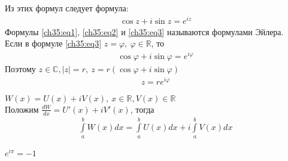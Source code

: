 Из этих формул следует формула:
\begin{gather}
  \cos z + i \sin z = e^{iz} \label{ch35:eq3}
\end{gather}
Формулы \eqref{ch35:eq1}, \eqref{ch35:eq2} и \eqref{ch35:eq3} называются
формулами Эйлера. \\
Если в формуле \eqref{ch35:eq3} $z = \varphi, \ \varphi \in
\mathbb{R}$, то
\begin{gather*}
  \cos \varphi + i \sin \varphi = e^{i\varphi}
\end{gather*}
Поэтому $z \in \mathbb{C}, |z| = r, \ z = r(\cos \varphi + i \sin
\varphi)$
\begin{gather*}
  z = r e^{i\varphi}
\end{gather*}

\begin{definition}
  $W(x) = U(x) + iV(x), \ x \in \mathbb{R}, V(x) \in \mathbb{R}$ \\
  Положим $\frac{dW}{dx} = U'(x) + iV'(x)$, тогда
  \begin{gather*}
    \int\limits_a^b W(x) dx = \int\limits_a^b U(x) dx + i \int\limits_a^b V(x)
    dx
  \end{gather*}
\end{definition}
$e^{i\pi} = -1$
